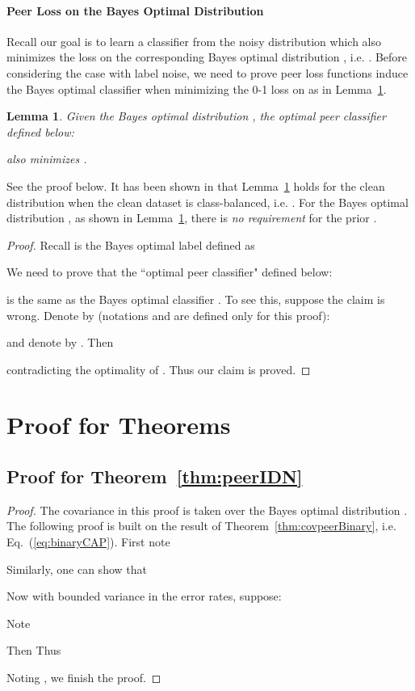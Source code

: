 \documentclass[final]{cvpr}
\newtheorem{lemma}{Lemma}
\begin{document}
\paragraph{Peer Loss on the Bayes Optimal Distribution}

Recall our goal is to learn a classifier  from the noisy distribution  which also minimizes the loss on the corresponding Bayes optimal distribution , i.e.
. 
Before considering the case with label noise, we need to prove peer loss functions induce the Bayes optimal classifier when minimizing the 0-1 loss on  as in Lemma~\ref{lem:peerBayes}.


\begin{lemma}\label{lem:peerBayes}
Given the Bayes optimal distribution , the optimal peer classifier defined below:

also minimizes .
\end{lemma}
See the proof below.
It has been shown in \cite{liu2019peer} that Lemma~\ref{lem:peerBayes} holds for the clean distribution  when the clean dataset is class-balanced, i.e. . For the Bayes optimal distribution , as shown in Lemma~\ref{lem:peerBayes}, there is \emph{no requirement} for the prior .

\begin{proof}

Recall  is the Bayes optimal label defined as 

We need to prove that the ``optimal peer classifier" defined below:

is the same as the Bayes optimal classifier . To see this, suppose the claim is wrong. Denote by (notations  and  are defined only for this proof): 

and denote by .
Then 

contradicting the optimality of . Thus our claim is proved.
\end{proof}
\section{Proof for Theorems}

\subsection{Proof for Theorem~\ref{thm:peerIDN}}\label{proof:peerIDN}


\begin{proof}
The covariance  in this proof is taken over the Bayes optimal distribution .
The following proof is built on the result of Theorem~\ref{thm:covpeerBinary}, i.e. Eq.~(\ref{eq:binaryCAP}).
First note

Similarly, one can show that 


Now with bounded variance in the error rates, suppose: 

Note

Then
Thus 

Noting , we finish the proof.

\end{proof}
\end{document}
